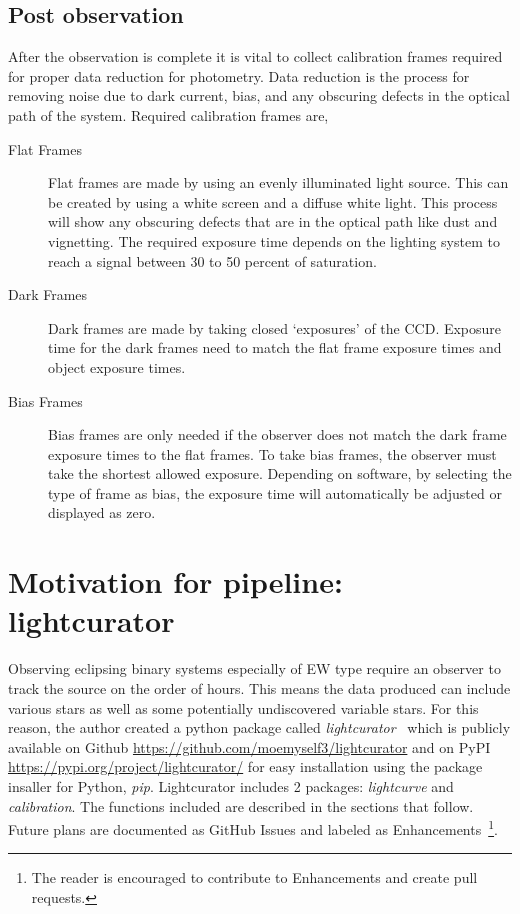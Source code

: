 \subsection{Post observation}
After the observation is complete it is vital to collect calibration frames required for proper data reduction for photometry.
Data reduction is the process for removing noise due to dark current, bias, and any obscuring defects in the optical path of the system.
Required calibration frames are,
\begin{description}
    \item[Flat Frames] Flat frames are made by using an evenly illuminated light source. This can be created by using a white screen
        and a diffuse white light. This process will show any obscuring defects that are in the optical path like dust and vignetting.
        The required exposure time depends on the lighting system to reach a signal between 30 to 50 percent of saturation.
    \item[Dark Frames] Dark frames are made by taking closed `exposures' of the CCD\@. Exposure time for the dark frames need to match
        the flat frame exposure times and object exposure times.
    \item[Bias Frames] Bias frames are only needed if the observer does not match the dark frame exposure times to the flat frames. 
        To take bias frames, the observer must take the shortest allowed exposure. Depending on software, by selecting the type of frame as bias,
        the exposure time will automatically be adjusted or displayed as zero.
\end{description}

\section{Motivation for pipeline: lightcurator}
Observing eclipsing binary systems especially of EW type require an observer to track the source on the order of hours.
This means the data produced can include various stars as well as some potentially undiscovered variable stars.
For this reason, the author created a python package called 
\textit{lightcurator}~\cite{castillo_2019} which is publicly available on Github \url{https://github.com/moemyself3/lightcurator}
and on PyPI \url{https://pypi.org/project/lightcurator/} for easy installation using the package insaller for Python, \textit{pip}.
Lightcurator includes 2 packages: \textit{lightcurve} and \textit{calibration}.
The functions included are described in the sections that follow.
Future plans are documented as GitHub Issues and labeled
as Enhancements~\footnote{The reader is encouraged to contribute to Enhancements and create pull requests.}.

